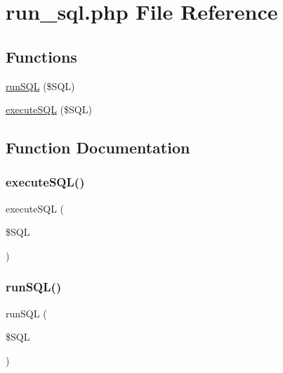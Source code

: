 \hypertarget{run__sql_8php}{}\section{run\+\_\+sql.\+php File Reference}
\label{run__sql_8php}
\subsection*{Functions}
\begin{DoxyCompactItemize}
\item 
\hyperlink{run__sql_8php_a508906286211b4a6c5c393195505b870}{run\+S\+QL} (\$S\+QL)
\item 
\hyperlink{run__sql_8php_ae7537e9436403cfa806d5ccfc980ea24}{execute\+S\+QL} (\$S\+QL)
\end{DoxyCompactItemize}


\subsection{Function Documentation}
\hypertarget{run__sql_8php_ae7537e9436403cfa806d5ccfc980ea24}{}\label{run__sql_8php_ae7537e9436403cfa806d5ccfc980ea24} 
\subsubsection{\texorpdfstring{execute\+S\+Q\+L()}{executeSQL()}}
{\footnotesize\ttfamily execute\+S\+QL (\begin{DoxyParamCaption}\item[{}]{\$\+S\+QL }\end{DoxyParamCaption})}

\hypertarget{run__sql_8php_a508906286211b4a6c5c393195505b870}{}\label{run__sql_8php_a508906286211b4a6c5c393195505b870} 
\subsubsection{\texorpdfstring{run\+S\+Q\+L()}{runSQL()}}
{\footnotesize\ttfamily run\+S\+QL (\begin{DoxyParamCaption}\item[{}]{\$\+S\+QL }\end{DoxyParamCaption})}

